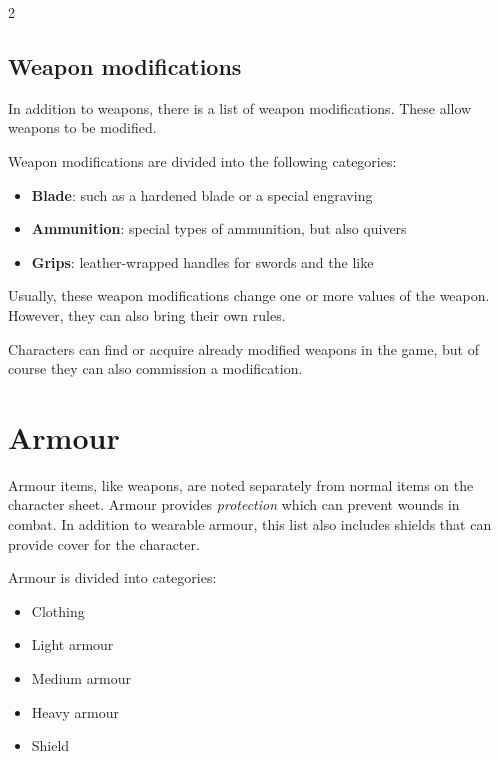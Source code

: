 \begin{multicols}{2}
\subsection{Weapon modifications}

In addition to weapons, there is a list of weapon modifications. These allow weapons to be modified.


Weapon modifications are divided into the following categories:
\begin{itemize}
    \item \textbf{Blade}: such as a hardened blade or a special engraving
    \item \textbf{Ammunition}: special types of ammunition, but also quivers
    \item \textbf{Grips}: leather-wrapped handles for swords and the like
\end{itemize}

Usually, these weapon modifications change one or more values of the weapon. However, they can also bring their own rules.

Characters can find or acquire already modified weapons in the game, but of course they can also commission a modification.

\section{Armour}

Armour items, like weapons, are noted separately from normal items on the character sheet. Armour provides \textit{protection} which can prevent wounds in combat. In addition to wearable armour, this list also includes shields that can provide cover for the character.

Armour is divided into categories:
\begin{itemize}
    \item Clothing
    \item Light armour
    \item Medium armour
    \item Heavy armour
    \item Shield
\end{itemize}


\end{multicols}
